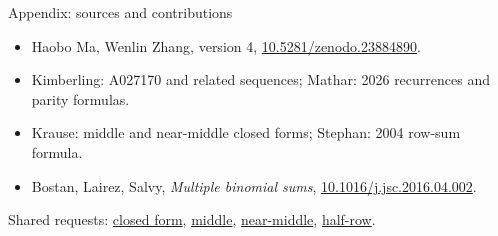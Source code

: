 \documentclass{beamer}
\begin{document}
\begin{frame}{Appendix: sources and contributions}
\small
\begin{itemize}
\item Haobo Ma, Wenlin Zhang, version 4, \href{https://doi.org/10.5281/zenodo.23884890}{10.5281/zenodo.23884890}.
\item Kimberling: A027170 and related sequences; Mathar: 2026 recurrences and parity formulas.
\item Krause: middle and near-middle closed forms; Stephan: 2004 row-sum formula.
\item Bostan, Lairez, Salvy, \emph{Multiple binomial sums}, \href{https://doi.org/10.1016/j.jsc.2016.04.002}{10.1016/j.jsc.2016.04.002}.
\end{itemize}
Shared requests: \href{https://github.com/the-omega-institute/trureturing-requests/issues/253}{closed form}, \href{https://github.com/the-omega-institute/trureturing-requests/issues/254}{middle}, \href{https://github.com/the-omega-institute/trureturing-requests/issues/255}{near-middle}, \href{https://github.com/the-omega-institute/trureturing-requests/issues/256}{half-row}.
\end{frame}
\FormalVerification
\end{document}
